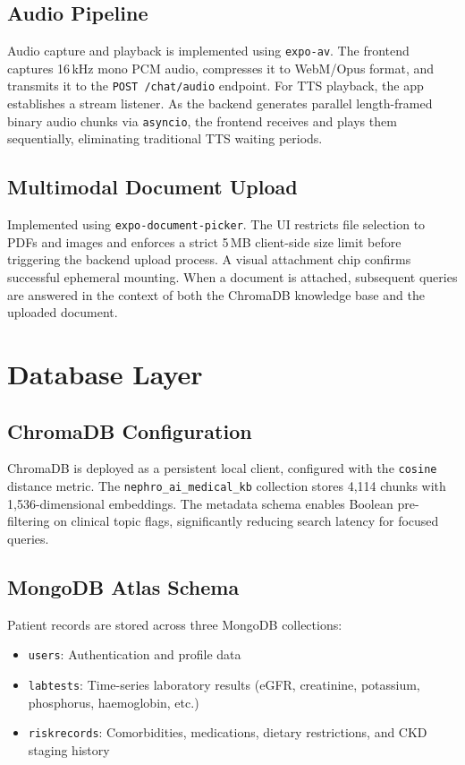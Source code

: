 \documentclass[12pt,a4paper]{report}
\begin{document}
\subsection{Audio Pipeline}

Audio capture and playback is implemented using \texttt{expo-av}. The frontend captures 16\,kHz mono PCM audio, compresses it to WebM/Opus format, and transmits it to the \texttt{POST /chat/audio} endpoint. For TTS playback, the app establishes a stream listener. As the backend generates parallel length-framed binary audio chunks via \texttt{asyncio}, the frontend receives and plays them sequentially, eliminating traditional TTS waiting periods.

\subsection{Multimodal Document Upload}

Implemented using \texttt{expo-document-picker}. The UI restricts file selection to PDFs and images and enforces a strict 5\,MB client-side size limit before triggering the backend upload process. A visual attachment chip confirms successful ephemeral mounting. When a document is attached, subsequent queries are answered in the context of both the ChromaDB knowledge base and the uploaded document.

\section{Database Layer}

\subsection{ChromaDB Configuration}

ChromaDB is deployed as a persistent local client, configured with the \texttt{cosine} distance metric. The \texttt{nephro\_ai\_medical\_kb} collection stores 4,114 chunks with 1,536-dimensional embeddings. The metadata schema enables Boolean pre-filtering on clinical topic flags, significantly reducing search latency for focused queries.

\subsection{MongoDB Atlas Schema}

Patient records are stored across three MongoDB collections:
\begin{itemize}
  \item \texttt{users}: Authentication and profile data
  \item \texttt{labtests}: Time-series laboratory results (eGFR, creatinine, potassium, phosphorus, haemoglobin, etc.)
  \item \texttt{riskrecords}: Comorbidities, medications, dietary restrictions, and CKD staging history
\end{itemize}
\end{document}
